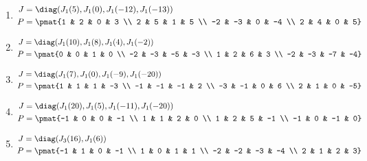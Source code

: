 \begin{enumerate}
\item

\begin{align*}
J &= \diag(J_{1}(5), J_{1}(0), J_{1}(-12), J_{1}(-13))\\
P &= \pmat{1 & 2 & 0 & 3 \\ 2 & 5 & 1 & 5 \\ -2 & -3 & 0 & -4 \\ 2 & 4 & 0 & 5}
\end{align*}

\item

\begin{align*}
J &= \diag(J_{1}(10), J_{1}(8), J_{1}(4), J_{1}(-2))\\
P &= \pmat{0 & 0 & 1 & 0 \\ -2 & -3 & -5 & -3 \\ 1 & 2 & 6 & 3 \\ -2 & -3 & -7 & -4}
\end{align*}

\item

\begin{align*}
J &= \diag(J_{1}(7), J_{1}(0), J_{1}(-9), J_{1}(-20))\\
P &= \pmat{1 & 1 & 1 & -3 \\ -1 & -1 & -1 & 2 \\ -3 & -1 & 0 & 6 \\ 2 & 1 & 0 & -5}
\end{align*}

\item

\begin{align*}
J &= \diag(J_{1}(20), J_{1}(5), J_{1}(-11), J_{1}(-20))\\
P &= \pmat{-1 & 0 & 0 & -1 \\ 1 & 1 & 2 & 0 \\ 1 & 2 & 5 & -1 \\ -1 & 0 & -1 & 0}
\end{align*}

\item

\begin{align*}
J &= \diag(J_{3}(16), J_{1}(6))\\
P &= \pmat{-1 & 1 & 0 & -1 \\ 1 & 0 & 1 & 1 \\ -2 & -2 & -3 & -4 \\ 2 & 1 & 2 & 3}
\end{align*}


\end{enumerate}
